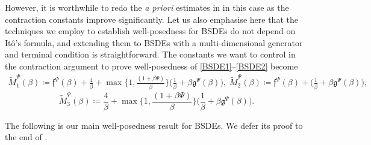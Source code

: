 \documentclass[10pt]{article} %
\newcommand\ff{\mathfrak f}
\newcommand\fg{\mathfrak g}
\newcommand{\1}{\mathbf{1}}
\begin{document}
However, it is worthwhile to redo the \emph{a priori} estimates in  in this case as the contraction constants improve significantly. Let us also emphasise here that the techniques we employ to establish well-posedness for BSDEs do not depend on It\^o's formula, and extending them to BSDEs with a multi-dimensional generator and terminal condition is straightforward. The constants we want to control in the contraction argument to prove well-posedness of \ref{BSDE1}--\ref{BSDE2} become
\begin{align*}\label{eq::tilde_pi_psi_1} %
	\widetilde M_1^\Psi(\beta) \coloneqq \ff^\Psi(\beta) + \frac{4}{\beta} + \max\bigg\{1,\frac{(1+\beta\Psi)}\beta\bigg\}\bigg(\frac{1}{\beta} + \beta \fg^\Psi(\beta)\bigg),\;	\widetilde M_2^\Psi(\beta) \coloneqq \ff^\Psi(\beta) + \bigg(\frac{1}{\beta} + \beta \fg^\Psi(\beta)\bigg),
\end{align*}
\begin{equation*}
	\widetilde M_3^\Psi(\beta) \coloneqq \frac{4}{\beta} + \max\bigg\{1,\frac{(1+\beta\Psi)}\beta\bigg\}\bigg(\frac{1}{\beta} + \beta \fg^\Psi(\beta)\bigg).
\end{equation*}


The following is our main well-posedness result for BSDEs. We defer its proof to the end of .
\end{document}
